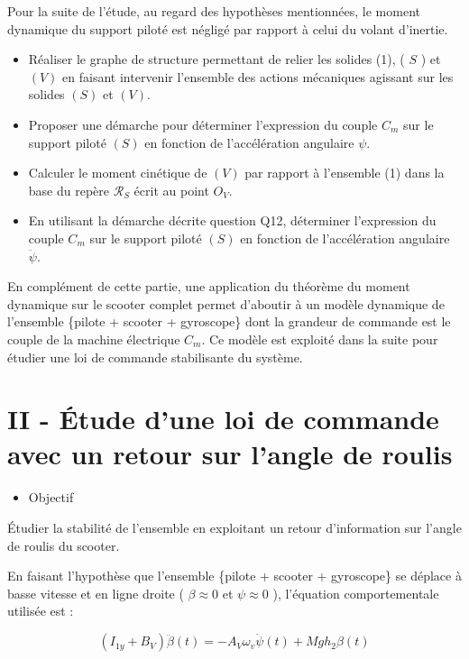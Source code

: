 \documentclass[10pt]{article}
\begin{document}
Pour la suite de l'étude, au regard des hypothèses mentionnées, le moment dynamique du support piloté est négligé par rapport à celui du volant d'inertie.

\begin{itemize}
  \item[Q11.] Réaliser le graphe de structure permettant de relier les solides (1), ( $S$ ) et $(V)$ en faisant intervenir l'ensemble des actions mécaniques agissant sur les solides $(S)$ et $(V)$.
  \item[Q12.] Proposer une démarche pour déterminer l'expression du couple $C_{m}$ sur le support piloté $(S)$ en fonction de l'accélération angulaire $\psi$.
  \item[Q13.] Calculer le moment cinétique de $(V)$ par rapport à l'ensemble (1) dans la base du repère $\mathcal{R}_{S}$ écrit au point $O_{V}$.
  \item[Q14.] En utilisant la démarche décrite question Q12, déterminer l'expression du couple $C_{m}$ sur le support piloté $(S)$ en fonction de l'accélération angulaire $\ddot{\psi}$.
\end{itemize}

En complément de cette partie, une application du théorème du moment dynamique sur le scooter complet permet d'aboutir à un modèle dynamique de l'ensemble \{pilote + scooter + gyroscope\} dont la grandeur de commande est le couple de la machine électrique $C_{m}$. Ce modèle est exploité dans la suite pour étudier une loi de commande stabilisante du système.

\section{II - Étude d'une loi de commande avec un retour sur l'angle de roulis}
\begin{itemize}
  \item Objectif
\end{itemize}

Étudier la stabilité de l'ensemble en exploitant un retour d'information sur l'angle de roulis du scooter.

En faisant l'hypothèse que l'ensemble \{pilote + scooter + gyroscope\} se déplace à basse vitesse et en ligne droite ( $\beta \approx 0$ et $\psi \approx 0$ ), l'équation comportementale utilisée est :


\begin{equation*}
\left(I_{1 y}+B_{V}\right) \ddot{\beta}(t)=-A_{V} \omega_{v} \dot{\psi}(t)+M g h_{2} \beta(t) \tag{1}
\end{equation*}
\end{document}
